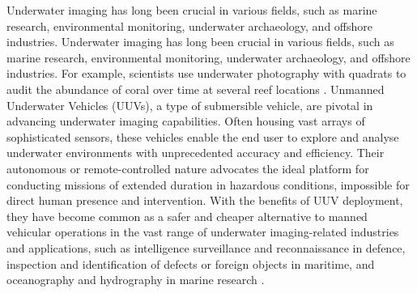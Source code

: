 Underwater imaging has long been crucial in various fields, such as marine research, environmental monitoring, underwater archaeology, and offshore industries. Underwater imaging has long been crucial in various fields, such as marine research, environmental monitoring, underwater archaeology, and offshore industries. For example, scientists use underwater photography with quadrats to audit the abundance of coral over time at several reef locations \cite{universityofhawaiiPracticesScienceUnderwater}. Unmanned Underwater Vehicles (UUVs), a type of submersible vehicle, are pivotal in advancing underwater imaging capabilities. Often housing vast arrays of sophisticated sensors, these vehicles enable the end user to explore and analyse underwater environments with unprecedented accuracy and efficiency. Their autonomous or remote-controlled nature advocates the ideal platform for conducting missions of extended duration in hazardous conditions, impossible for direct human presence and intervention. With the benefits of UUV deployment, they have become common as a safer and cheaper alternative to manned vehicular operations in the vast range of underwater imaging-related industries and applications, such as intelligence surveillance and reconnaissance in defence, inspection and identification of defects or foreign objects in maritime, and oceanography and hydrography in marine research \cite{yannickallardUnmannedUnderwaterVehicle2014}.

